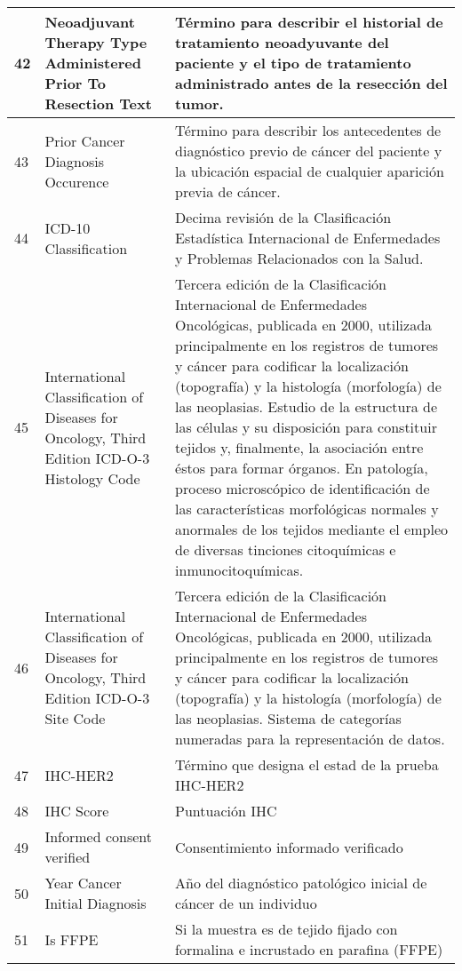 \begin{table*} [!htb]
\begin{threeparttable}
\begin{tabular}{p{1cm} p{4cm} p{10cm}}
			\\ \hline	42	&	Neoadjuvant Therapy Type Administered Prior To Resection Text	&	Término para describir el historial de tratamiento neoadyuvante del paciente y el tipo de tratamiento administrado antes de la resección del tumor.
			\\ \hline	43	&	Prior Cancer Diagnosis Occurence	&	Término para describir los antecedentes de diagnóstico previo de cáncer del paciente y la ubicación espacial de cualquier aparición previa de cáncer.
			\\ \hline	44	&	ICD-10 Classification	&	Decima revisión de la Clasificación Estadística Internacional de Enfermedades y Problemas Relacionados con la Salud.
			\\ \hline	45	&	International Classification of Diseases for Oncology, Third Edition ICD-O-3 Histology Code	&	Tercera edición de la Clasificación Internacional de Enfermedades Oncológicas, publicada en 2000, utilizada principalmente en los registros de tumores y cáncer para codificar la localización (topografía) y la histología (morfología) de las neoplasias. Estudio de la estructura de las células y su disposición para constituir tejidos y, finalmente, la asociación entre éstos para formar órganos. En patología, proceso microscópico de identificación de las características morfológicas normales y anormales de los tejidos mediante el empleo de diversas tinciones citoquímicas e inmunocitoquímicas.
			\\ \hline	46	&	International Classification of Diseases for Oncology, Third Edition ICD-O-3 Site Code	&	Tercera edición de la Clasificación Internacional de Enfermedades Oncológicas, publicada en 2000, utilizada principalmente en los registros de tumores y cáncer para codificar la localización (topografía) y la histología (morfología) de las neoplasias. Sistema de categorías numeradas para la representación de datos.
			\\ \hline	47	&	IHC-HER2	&	Término que designa el estad de la prueba IHC-HER2
			\\ \hline	48	&	IHC Score	&	Puntuación IHC
			\\ \hline	49	&	Informed consent verified	&	Consentimiento informado verificado
			\\ \hline	50	&	Year Cancer Initial Diagnosis	&	Año del diagnóstico patológico inicial de cáncer de un individuo
			\\ \hline	51	&	Is FFPE	&	Si la muestra es de tejido fijado con formalina e incrustado en parafina (FFPE)
			\\ \hline
		\end{tabular}
	\end{threeparttable}
\end{table*}

